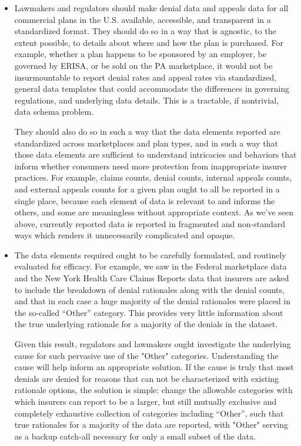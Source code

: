\documentclass[12pt, a4paper,twoside,parskip=full]{report}
\theoremstyle{plain} %
\theoremstyle{definition} %
\theoremstyle{remark} %
\numberwithin{equation}{chapter}
\begin{document}
		\begin{itemize}
			
			\item Lawmakers and regulators should make denial data and appeals data for all commercial plans in the U.S. available,
			accessible, and transparent in a standardized format. They should do so in a way that is agnostic, to the extent possible,
			to details about where and how the plan is purchased. For example, whether a plan 
			happens to be sponsored by an employer, be governed by ERISA, or be sold on the PA marketplace, it would 
			not be insurmountable to report denial rates and appeal rates via standardized, general data templates 
			that could accommodate the differences in governing regulations, and underlying data details. This is a 
			tractable, if nontrivial, data schema problem.
			
			They should also do so in such a way that the data elements reported are standardized across marketplaces 
			and plan types, and in such a way that those data elements are sufficient to understand intricacies and behaviors 
			that inform whether consumers need more protection from inappropriate insurer practices. For example, claims counts, 
			denial counts, internal appeals counts, and external appeals counts for a given plan ought to all be reported in a single place, 
			because each element of data is relevant to and informs the others, and some are meaningless without appropriate context. As we've 
			seen above, currently reported data is reported in fragmented and non-standard ways which renders it unnecessarily complicated and opaque.
			
			\item The data elements required ought to be carefully formulated, and routinely evaluated for efficacy. For example, we saw in the Federal marketplace data and the New York Health 
			Care Claims Reports data that insurers are asked to include the breakdown of denial rationales along with the denial counts, and that in each 
			case a huge majority of the denial rationales were placed in the so-called ``Other'' category. This provides very little information about the true 
			underlying rationale for a majority of the denials in the dataset.
			
			Given this result, regulators and lawmakers ought  investigate the underlying cause for such pervasive use of the "Other" categories. 
			Understanding the cause will help inform an appropriate solution. If the cause is truly that most denials are denied
			for reasons that can not be characterized with existing rationale options, the solution is simple: change the allowable categories
			with which insurers can report
			to be a larger, but still mutually exclusive and completely exhaustive collection of categories including ``Other'',
			such that true rationales for a majority of the data are reported, with "Other" serving as a backup catch-all necessary
			for only a small subset of the data.
			

\end{itemize}
\end{document}
